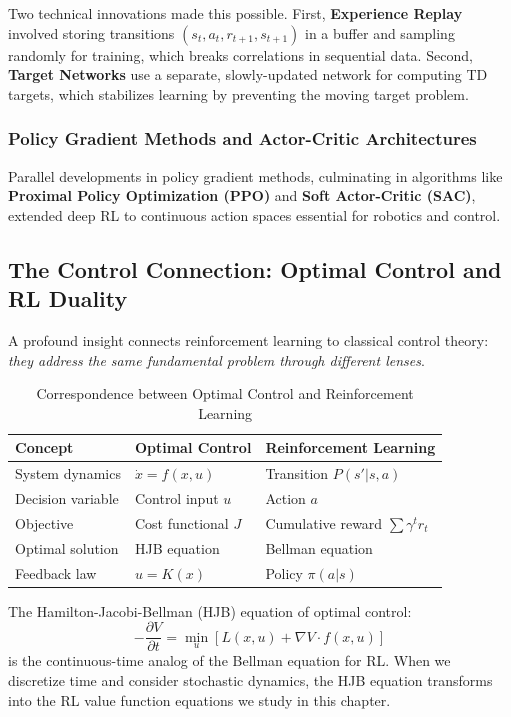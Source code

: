 Two technical innovations made this possible. First, \textbf{Experience Replay} involved storing transitions $(s_t, a_t, r_{t+1}, s_{t+1})$ in a buffer and sampling randomly for training, which breaks correlations in sequential data. Second, \textbf{Target Networks} use a separate, slowly-updated network for computing TD targets, which stabilizes learning by preventing the moving target problem.

\subsubsection{Policy Gradient Methods and Actor-Critic Architectures}

Parallel developments in policy gradient methods, culminating in algorithms like \textbf{Proximal Policy Optimization (PPO)} and \textbf{Soft Actor-Critic (SAC)}, extended deep RL to continuous action spaces essential for robotics and control.

\subsection{The Control Connection: Optimal Control and RL Duality}

A profound insight connects reinforcement learning to classical control theory: \textit{they address the same fundamental problem through different lenses}.

\begin{table}[htbp]
\centering
\caption{Correspondence between Optimal Control and Reinforcement Learning}
\label{tab:control_rl_correspondence}
\begin{tabular}{@{}lll@{}}
\toprule
\textbf{Concept} & \textbf{Optimal Control} & \textbf{Reinforcement Learning} \\
\midrule
System dynamics & $\dot{x} = f(x, u)$ & Transition $P(s'|s,a)$ \\
Decision variable & Control input $u$ & Action $a$ \\
Objective & Cost functional $J$ & Cumulative reward $\sum \gamma^t r_t$ \\
Optimal solution & HJB equation & Bellman equation \\
Feedback law & $u = K(x)$ & Policy $\pi(a|s)$ \\
\bottomrule
\end{tabular}
\end{table}

The Hamilton-Jacobi-Bellman (HJB) equation of optimal control:
\begin{equation}
-\frac{\partial V}{\partial t} = \min_u \left[ L(x,u) + \nabla V \cdot f(x,u) \right]
\end{equation}
is the continuous-time analog of the Bellman equation for RL. When we discretize time and consider stochastic dynamics, the HJB equation transforms into the RL value function equations we study in this chapter.

